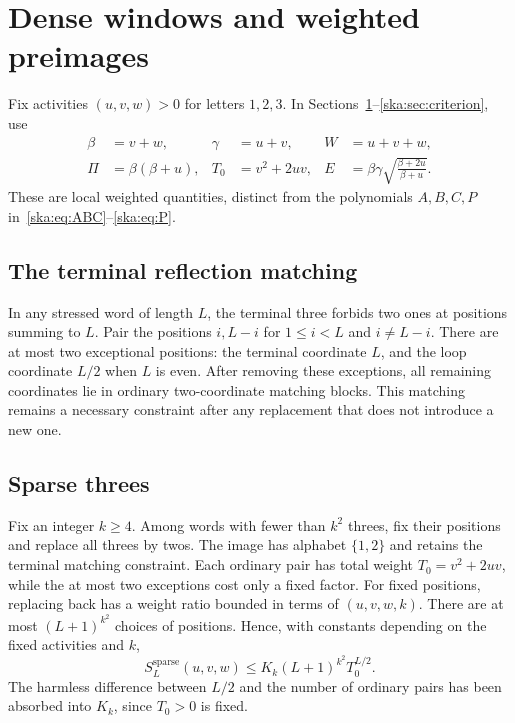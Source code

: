 \documentclass[11pt,letterpaper]{article}
\theoremstyle{definition}
\begin{document}
\section{Dense windows and weighted preimages}\label{ska:sec:standardization}
Fix activities $(u,v,w)>0$ for letters $1,2,3$. In Sections~\ref{ska:sec:standardization}--\ref{ska:sec:criterion}, use
\begin{align}
\beta&=v+w,&\gamma&=u+v,&W&=u+v+w,\label{ska:eq:localnotation}\\
\Pi&=\beta(\beta+u),&T_0&=v^2+2uv,&
E&=\beta\gamma\sqrt{\frac{\beta+2u}{\beta+u}}.\label{ska:eq:pairfactors}
\end{align}
These are local weighted quantities, distinct from the polynomials $A,B,C,P$ in~\eqref{ska:eq:ABC}--\eqref{ska:eq:P}.

\subsection{The terminal reflection matching}
In any stressed word of length $L$, the terminal three forbids two ones at positions summing to $L$. Pair the positions $i,L-i$ for $1\le i<L$ and $i\ne L-i$. There are at most two exceptional positions: the terminal coordinate $L$, and the loop coordinate $L/2$ when $L$ is even. After removing these exceptions, all remaining coordinates lie in ordinary two-coordinate matching blocks. This matching remains a necessary constraint after any replacement that does not introduce a new one.

\subsection{Sparse threes}
Fix an integer $k\ge4$. Among words with fewer than $k^2$ threes, fix their positions and replace all threes by twos. The image has alphabet $\{1,2\}$ and retains the terminal matching constraint. Each ordinary pair has total weight $T_0=v^2+2uv$, while the at most two exceptions cost only a fixed factor. For fixed positions, replacing back has a weight ratio bounded in terms of $(u,v,w,k)$. There are at most $(L+1)^{k^2}$ choices of positions. Hence, with constants depending on the fixed activities and $k$,
\begin{equation}\label{ska:eq:sparse}
S_L^{\mathrm{sparse}}(u,v,w)
\le K_k(L+1)^{k^2}T_0^{L/2}.
\end{equation}
The harmless difference between $L/2$ and the number of ordinary pairs has been absorbed into $K_k$, since $T_0>0$ is fixed.
\end{document}

